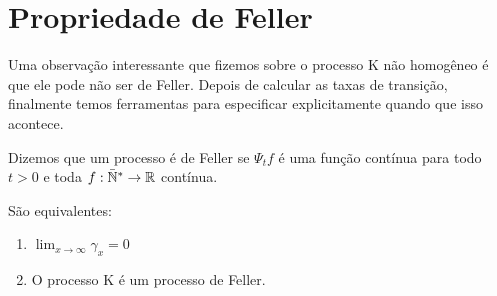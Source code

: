 
\section{Propriedade de Feller}
\label{sec:prop-feller}


Uma observação interessante que fizemos sobre o processo K não
homogêneo é que ele pode não ser de Feller.  Depois de calcular as
taxas de transição, finalmente temos ferramentas para especificar
explicitamente quando que isso acontece.

Dizemos que um processo é de Feller se $\Psi_t f$ é uma função contínua
para todo $t > 0$ e toda $f: {\mathbb{\bar{N}^*}} \to {\mathbb{R}}$ contínua.

\begin{proposicao}
  São equivalentes:
  \begin{enumerate}
  \item $\lim_{x \to \infty} \gamma_x = 0$
  \item O processo K é um processo de Feller.
  \end{enumerate}
\end{proposicao}

